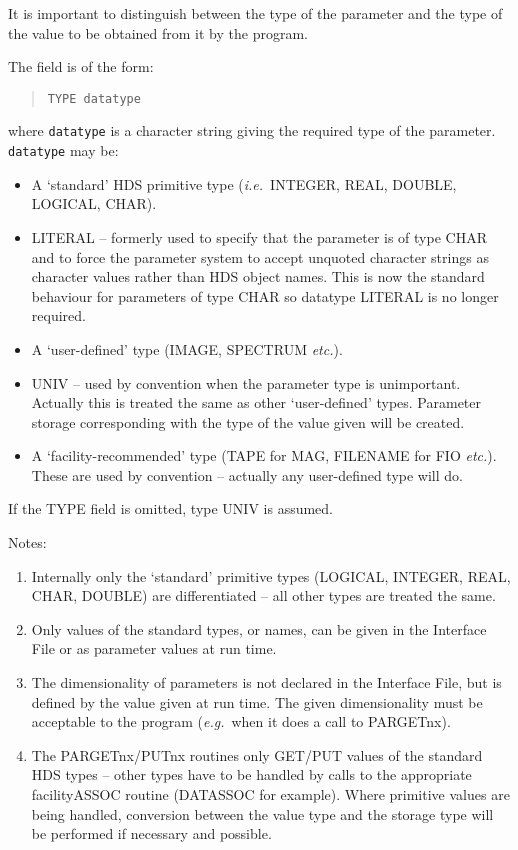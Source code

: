 \documentclass[twoside,11pt]{article}
\renewcommand{\_}{\texttt{\symbol{95}}}
\begin{document}
It is important to distinguish between the type of the parameter and the type
of the value to be obtained from it by the program.

The field is of the form:
\begin{quote} \begin{verbatim}
TYPE datatype
\end{verbatim} \end{quote}
where \texttt{datatype} is a character string giving the required type of the
parameter.
\texttt{datatype} may be:
\begin{itemize}
\item A `standard' HDS primitive type ({\em i.e.}\ \_INTEGER, \_REAL, \_DOUBLE, \_LOGICAL,
\_CHAR).
\item LITERAL -- formerly used to specify that the parameter is of type \_CHAR
and to force the parameter system to accept unquoted character strings as
character values rather than HDS object names.
This is now the standard behaviour for parameters of type \_CHAR so datatype
LITERAL is no longer required.
\item A `user-defined' type (IMAGE, SPECTRUM {\em etc.}).
\item UNIV -- used by convention when the parameter type is unimportant.
Actually this is treated the same as other `user-defined' types.
Parameter storage corresponding with the type of the value given will be
created.
\item A `facility-recommended' type (TAPE for MAG, FILENAME for FIO {\em etc.}).
These are used by convention -- actually any user-defined type will do.
\end{itemize}
If the TYPE field is omitted, type UNIV is assumed.

Notes:
\begin{enumerate}
\item Internally only the `standard' primitive types (\_LOGICAL, \_INTEGER,
\_REAL, \_CHAR, \_DOUBLE) are differentiated -- all other types are treated
the same.
\item Only values of the standard types, or names, can be given in the
Interface File or as parameter values at run time.
\item The dimensionality of parameters is not declared in the
Interface File, but is defined by the value given at run time.
The given dimensionality must be acceptable to the program
({\em e.g.}\ when it does a call to PAR\_GETnx).
\item The PAR\_GETnx/\_PUTnx routines only GET/PUT values of the
standard HDS types --
other types have to be handled by calls to the appropriate facility\_ASSOC
routine (DAT\_ASSOC for example).
Where primitive values are being handled, conversion between the value type
and the storage type will be performed if necessary and possible.
\end{enumerate}
\end{document}
